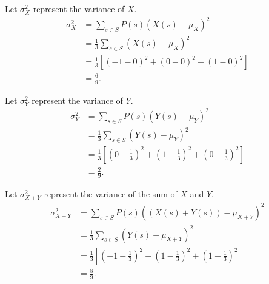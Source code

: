\documentclass{article}
\theoremstyle{definition}
\begin{document}
Let $\sigma_X^2$ represent the variance of $X$.
\begin{align*}
\sigma_X^2
&=\sum_{s\in S}{P(s)(X(s)-\mu_X)^2}\\
&=\frac{1}{3}\sum_{s\in S}{(X(s)-\mu_X)^2}\\
&=\frac{1}{3}\left[\left(-1-0\right)^2+\left(0-0\right)^2+\left(1-0\right)^2\right]\\
&=\frac{6}{9}.
\end{align*}

Let $\sigma_Y^2$ represent the variance of $Y$.
\begin{align*}
\sigma_Y^2
&=\sum_{s\in S}{P(s)(Y(s)-\mu_Y)^2}\\
&=\frac{1}{3}\sum_{s\in S}{(Y(s)-\mu_Y)^2}\\
&=\frac{1}{3}\left[\left(0-\frac{1}{3}\right)^2+\left(1-\frac{1}{3}\right)^2+\left(0-\frac{1}{3}\right)^2\right]\\
&=\frac{2}{9}.
\end{align*}

Let $\sigma_{X+Y}^2$ represent the variance of the sum of $X$ and $Y$.
\begin{align*}
\sigma_{X+Y}^2
&=\sum_{s\in S}{P(s)((X(s)+Y(s))-\mu_{X+Y})^2}\\
&=\frac{1}{3}\sum_{s\in S}{(Y(s)-\mu_{X+Y})^2}\\
&=\frac{1}{3}\left[\left(-1-\frac{1}{3}\right)^2+\left(1-\frac{1}{3}\right)^2+\left(1-\frac{1}{3}\right)^2\right]\\
&=\frac{8}{9}.
\end{align*}
\end{document}
